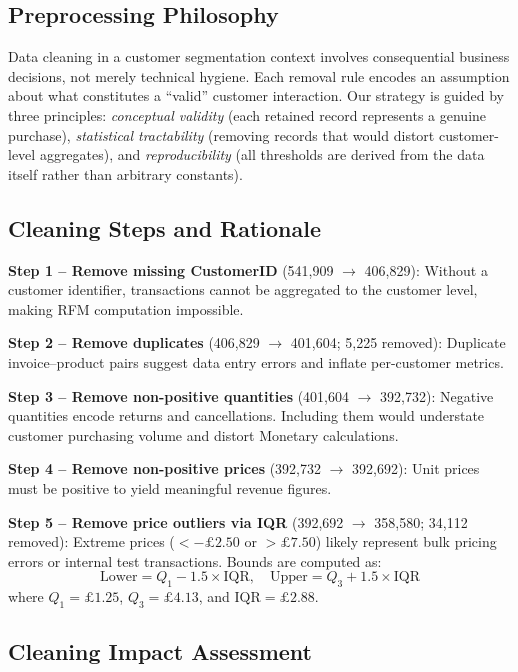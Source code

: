 \documentclass[12pt,a4paper]{article}
\begin{document}
\subsection{Preprocessing Philosophy}

Data cleaning in a customer segmentation context involves consequential business
decisions, not merely technical hygiene.  Each removal rule encodes an assumption about
what constitutes a ``valid'' customer interaction.  Our strategy is guided by three
principles: \emph{conceptual validity} (each retained record represents a genuine
purchase), \emph{statistical tractability} (removing records that would distort
customer-level aggregates), and \emph{reproducibility} (all thresholds are derived
from the data itself rather than arbitrary constants).

\subsection{Cleaning Steps and Rationale}

\textbf{Step 1 -- Remove missing CustomerID} (541,909 $\to$ 406,829): Without a
customer identifier, transactions cannot be aggregated to the customer level, making
RFM computation impossible.

\textbf{Step 2 -- Remove duplicates} (406,829 $\to$ 401,604; 5,225 removed): Duplicate
invoice--product pairs suggest data entry errors and inflate per-customer metrics.

\textbf{Step 3 -- Remove non-positive quantities} (401,604 $\to$ 392,732): Negative
quantities encode returns and cancellations.  Including them would understate customer
purchasing volume and distort Monetary calculations.

\textbf{Step 4 -- Remove non-positive prices} (392,732 $\to$ 392,692): Unit prices
must be positive to yield meaningful revenue figures.

\textbf{Step 5 -- Remove price outliers via IQR} (392,692 $\to$ 358,580; 34,112
removed): Extreme prices ($< -\pounds2.50$ or $> \pounds7.50$) likely represent bulk
pricing errors or internal test transactions.  Bounds are computed as:
\[
  \text{Lower} = Q_1 - 1.5 \times \text{IQR}, \quad
  \text{Upper} = Q_3 + 1.5 \times \text{IQR}
\]
where $Q_1 = \pounds1.25$, $Q_3 = \pounds4.13$, and $\text{IQR} = \pounds2.88$.

\subsection{Cleaning Impact Assessment}
\end{document}
